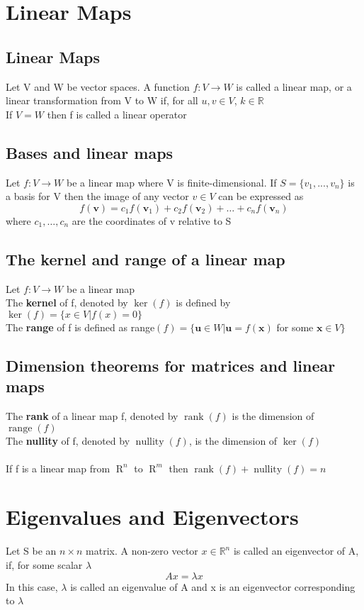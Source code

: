 \documentclass{article}[18pt]
\begin{document}
\section{Linear Maps}
\subsection{Linear Maps}
Let V and W be vector spaces. A function $f:V\rightarrow W$ is called a linear map, or a linear transformation from V to W if, for all $u,v\in V$, $k\in \mathbb{R}$\\
If $V=W$ then f is called a linear operator
\subsection{Bases and linear maps}
Let $f:V\rightarrow W$ be a linear map where V is finite-dimensional. If $S=\{v_1,...,v_n\}$ is a basis for V then the image of any vector $v\in V$ can be expressed as
\[
f(\mathbf{v})=c_{1} f\left(\mathbf{v}_{1}\right)+c_{2} f\left(\mathbf{v}_{2}\right)+\ldots+c_{n} f\left(\mathbf{v}_{n}\right)
\]
where $c_1,\ldots,c_n$ are the coordinates of v relative to S
\subsection{The kernel and range of a linear map}
Let $f:V\rightarrow W$ be a linear map\\
The \textbf{kernel} of f, denoted by $\operatorname{ker}(f)$ is defined by $\operatorname{ker}(f)=\{x\in V|f(x)=0\}$\\
The \textbf{range} of f is defined as range\((f)=\{\mathbf{u} \in W | \mathbf{u}=f(\mathbf{x})\) for some \(\mathbf{x} \in V\}\)
\subsection{Dimension theorems for matrices and linear maps}
The \textbf{rank} of a linear map f, denoted by $\operatorname{rank}(f)$ is the dimension of $\operatorname{range}(f)$\\
The \textbf{nullity} of f, denoted by $\operatorname{nullity}(f)$, is the dimension of $\operatorname{ker}(f)$\\
\\
If f is a linear map from $\operatorname{R}^n$ to $\operatorname{R}^m$ then $\operatorname{rank}(f)+\operatorname{nullity}(f)=n$
\section{Eigenvalues and Eigenvectors}
Let S be an $n\times n$ matrix. A non-zero vector $x\in \mathbb{R}^n$ is called an eigenvector of A, if, for some scalar $\lambda$
$$Ax=\lambda x$$
In this case, $\lambda$ is called an eigenvalue of A and x is an eigenvector corresponding to $\lambda$
\end{document}
